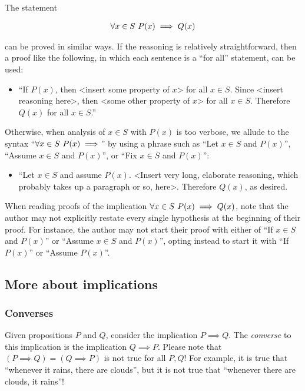 The statement

\begin{align*}
    \forall x \in S \text{ } P(x) \implies Q(x)
\end{align*}

can be proved in similar ways. If the reasoning is relatively straightforward, then a proof like the following, in which each sentence is a ``for all'' statement, can be used:

\begin{itemize}
    \item ``If $P(x)$, then <insert some property of $x$> for all $x \in S$. Since <insert reasoning here>, then <some other property of $x$> for all $x \in S$. Therefore $Q(x)$ for all $x \in S$.''
\end{itemize}

Otherwise, when analysis of $x \in S$ with $P(x)$ is too verbose, we allude to the syntax ``$\forall x \in S \text{ } P(x) \implies$'' by using a phrase such as ``Let $x \in S$ and $P(x)$'', ``Assume $x \in S$ and $P(x)$'', or ``Fix $x \in S$ and $P(x)$'':

\begin{itemize}
    \item ``Let $x \in S$ and assume $P(x)$. <Insert very long, elaborate reasoning, which probably takes up a paragraph or so, here>. Therefore $Q(x)$, as desired.
\end{itemize}

When reading proofs of the implication $\forall x \in S \text{ } P(x) \implies Q(x)$, note that the author may not explicitly restate every single hypothesis at the beginning of their proof. For instance, the author may not start their proof with either of ``If $x \in S$ and $P(x)$'' or ``Assume $x \in S$ and $P(x)$'', opting instead to start it with ``If $P(x)$'' or ``Assume $P(x)$''.

\subsection*{More about implications}

\subsubsection*{Converses}

Given propositions $P$ and $Q$, consider the implication $P \implies Q$. The \textit{converse} to this implication is the implication $Q \implies P$. Please note that $(P \implies Q) = (Q \implies P)$ is not true for all $P, Q$! For example, it is true that ``whenever it rains, there are clouds'', but it is not true that ``whenever there are clouds, it rains''!

